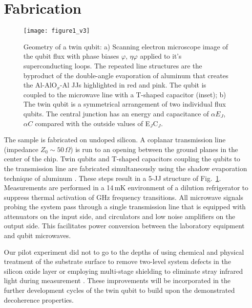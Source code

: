 \section{Fabrication}

\begin{figure}[h]
  \texttt{[image: figure1\_v3]}
  \caption{\small Geometry of a twin qubit: a) Scanning electron microscope image of the qubit
    flux with phase biases $ \varphi $, $ \eta\varphi $ applied to it's superconducting loops. The repeated line
    structures are the byproduct of the double-angle evaporation of aluminum that creates the
    Al-AlO$_x$-Al JJs highlighted in red and pink. The qubit is coupled to the microwave line
    with a T-shaped capacitor (inset); b) The twin qubit is a symmetrical arrangement of two
    individual flux qubits. The central junction has an energy and capacitance of
    $ \alpha E_{J}$, $\alpha C$ compared with the outside values of E$_J$C$_J$.}
  \label{fig:setup}
\end{figure}

\noindent The sample is fabricated on undoped silicon. A coplanar transmission line (impedance
$ Z_{0} \sim 50\,\Omega $) is run to an opening between the ground planes in the center of the
chip. Twin qubits and T-shaped capacitors coupling the qubits to the transmission line are
fabricated simultaneously using the shadow evaporation technique of aluminum
\cite{wu2013}. These steps result in a 5-JJ structure of Fig.~\ref{fig:setup}. Measurements
are performed in a 14\,mK environment of a dilution refrigerator to suppress thermal
activation of GHz frequency transitions.  All microwave signals probing the system pass
through a single transmission line that is equipped with attenuators on the input side, and
circulators and low noise amplifiers on the output side. This facilitates power conversion
between the laboratory equipment and qubit microwaves.

Our pilot experiment did not to go to the depths of using chemical and physical
treatment of the substrate surface to remove two-level system defects in the silicon oxide layer \cite{earnest2018} or employing multi-stage shielding to eliminate stray infrared light during
measurement \cite{barends2011}. These improvements will be incorporated in the further development cycles of the twin qubit to build upon the demonstrated decoherence properties.





